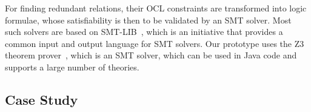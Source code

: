 
For finding redundant relations, their \gls{OCL} constraints are transformed into logic formulae, whose satisfiability is then to be validated by an \gls{SMT} solver.
Most such solvers are based on SMT-LIB~\cite{smtlib2017}, which is an initiative that provides a common input and output language for \gls{SMT} solvers.
Our prototype uses the Z3 theorem prover~\cite{z32008}, which is an \gls{SMT} solver, which can be used in Java code and supports a large number of theories.





\subsection{Case Study}
\label{chap:correctness_evaluation:compatibility:case_study}

